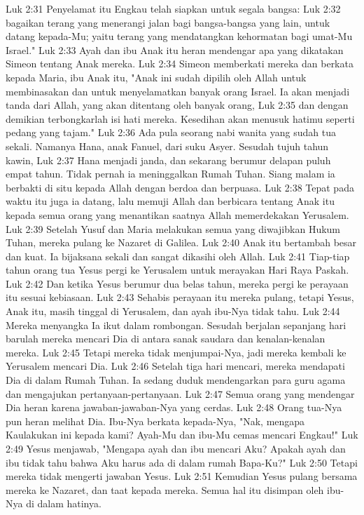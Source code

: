 Luk 2:31  Penyelamat itu Engkau telah siapkan untuk segala bangsa:
Luk 2:32  bagaikan terang yang menerangi jalan bagi bangsa-bangsa yang lain, untuk datang kepada-Mu; yaitu terang yang mendatangkan kehormatan bagi umat-Mu Israel."
Luk 2:33  Ayah dan ibu Anak itu heran mendengar apa yang dikatakan Simeon tentang Anak mereka.
Luk 2:34  Simeon memberkati mereka dan berkata kepada Maria, ibu Anak itu, "Anak ini sudah dipilih oleh Allah untuk membinasakan dan untuk menyelamatkan banyak orang Israel. Ia akan menjadi tanda dari Allah, yang akan ditentang oleh banyak orang,
Luk 2:35  dan dengan demikian terbongkarlah isi hati mereka. Kesedihan akan menusuk hatimu seperti pedang yang tajam."
Luk 2:36  Ada pula seorang nabi wanita yang sudah tua sekali. Namanya Hana, anak Fanuel, dari suku Asyer. Sesudah tujuh tahun kawin,
Luk 2:37  Hana menjadi janda, dan sekarang berumur delapan puluh empat tahun. Tidak pernah ia meninggalkan Rumah Tuhan. Siang malam ia berbakti di situ kepada Allah dengan berdoa dan berpuasa.
Luk 2:38  Tepat pada waktu itu juga ia datang, lalu memuji Allah dan berbicara tentang Anak itu kepada semua orang yang menantikan saatnya Allah memerdekakan Yerusalem.
Luk 2:39  Setelah Yusuf dan Maria melakukan semua yang diwajibkan Hukum Tuhan, mereka pulang ke Nazaret di Galilea.
Luk 2:40  Anak itu bertambah besar dan kuat. Ia bijaksana sekali dan sangat dikasihi oleh Allah.
Luk 2:41  Tiap-tiap tahun orang tua Yesus pergi ke Yerusalem untuk merayakan Hari Raya Paskah.
Luk 2:42  Dan ketika Yesus berumur dua belas tahun, mereka pergi ke perayaan itu sesuai kebiasaan.
Luk 2:43  Sehabis perayaan itu mereka pulang, tetapi Yesus, Anak itu, masih tinggal di Yerusalem, dan ayah ibu-Nya tidak tahu.
Luk 2:44  Mereka menyangka Ia ikut dalam rombongan. Sesudah berjalan sepanjang hari barulah mereka mencari Dia di antara sanak saudara dan kenalan-kenalan mereka.
Luk 2:45  Tetapi mereka tidak menjumpai-Nya, jadi mereka kembali ke Yerusalem mencari Dia.
Luk 2:46  Setelah tiga hari mencari, mereka mendapati Dia di dalam Rumah Tuhan. Ia sedang duduk mendengarkan para guru agama dan mengajukan pertanyaan-pertanyaan.
Luk 2:47  Semua orang yang mendengar Dia heran karena jawaban-jawaban-Nya yang cerdas.
Luk 2:48  Orang tua-Nya pun heran melihat Dia. Ibu-Nya berkata kepada-Nya, "Nak, mengapa Kaulakukan ini kepada kami? Ayah-Mu dan ibu-Mu cemas mencari Engkau!"
Luk 2:49  Yesus menjawab, "Mengapa ayah dan ibu mencari Aku? Apakah ayah dan ibu tidak tahu bahwa Aku harus ada di dalam rumah Bapa-Ku?"
Luk 2:50  Tetapi mereka tidak mengerti jawaban Yesus.
Luk 2:51  Kemudian Yesus pulang bersama mereka ke Nazaret, dan taat kepada mereka. Semua hal itu disimpan oleh ibu-Nya di dalam hatinya.
